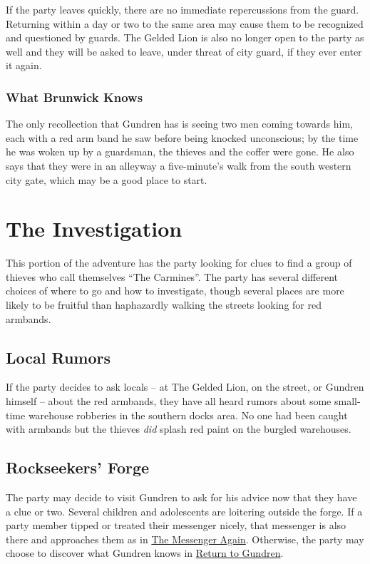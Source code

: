 \documentclass[10pt,twocolumn,openany,nodeprecatedcode,bg=none,inline]{dndbook}
\begin{document}
If the party leaves quickly, there are no immediate repercussions from the guard.
Returning within a day or two to the same area may cause them to be recognized and questioned by guards.
The Gelded Lion is also no longer open to the party as well and they will be asked to leave, under threat of city guard, if they ever enter it again.

\subsubsection{What Brunwick Knows}
\label{sec:brunwickKnows}
The only recollection that Gundren has is seeing two men coming towards him, each with a red arm band he saw before being knocked unconscious; by the time he was woken up by a guardsman, the thieves and the coffer were gone.
He also says that they were in an alleyway a five-minute's walk from the south western city gate, which may be a good place to start.

\section{The Investigation}
\label{sec:investigation}
This portion of the adventure has the party looking for clues to find a group of thieves who call themselves ``The Carmines''.
The party has several different choices of where to go and how to investigate, though several places are more likely to be fruitful than haphazardly walking the streets looking for red armbands.

\subsection{Local Rumors}
\label{sec:rumors}
If the party decides to ask locals -- at The Gelded Lion, on the street, or Gundren himself -- about the red armbands, they have all heard rumors about some small-time warehouse robberies in the southern docks area.
No one had been caught with armbands but the thieves \emph{did} splash red paint on the burgled warehouses.

\subsection{Rockseekers' Forge}
The party may decide to visit Gundren to ask for his advice now that they have a clue or two.
Several children and adolescents are loitering outside the forge.
If a party member tipped or treated their messenger nicely, that messenger is also there and approaches them as in \hyperref[sec:messengerReturns]{The Messenger Again}.
Otherwise, the party may choose to discover what Gundren knows in \hyperref[sec:returnGundren]{Return to Gundren}.
\end{document}
